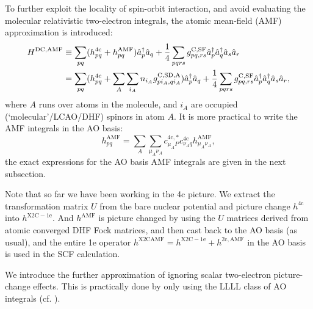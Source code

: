 \documentclass{article}
\begin{document}
To further exploit the locality of spin-orbit interaction, and avoid evaluating the molecular relativistic two-electron integrals, the atomic mean-field (AMF) approximation is introduced:
\begin{align}
H^{\mathrm{DC,AMF}}&\equiv\sum_{pq}(h_{pq}^{\mathrm{4c}}+h_{pq}^{\mathrm{AMF}})\hat{a}_p^{\dagger}\hat{a}_q+\frac{1}{4}\sum_{pqrs}g_{pq,rs}^{\mathrm{C,SF}}\hat{a}_p^{\dagger}\hat{a}_q^{\dagger}\hat{a}_s\hat{a}_r\\
&=\sum_{pq}(h_{pq}^{\mathrm{4c}} +\sum_A\sum_{i_A}n_{i_A}g_{p{i_A},q{i_A}}^{\mathrm{C,SD,A}})\hat{a}_p^{\dagger}\hat{a}_q+\frac{1}{4}\sum_{pqrs}g_{pq,rs}^{\mathrm{C,SF}}\hat{a}_p^{\dagger}\hat{a}_q^{\dagger}\hat{a}_s\hat{a}_r,
\end{align}
where $A$ runs over atoms in the molecule, and $i_A$ are occupied (`molecular'/LCAO/DHF) spinors in atom $A$. It is more practical to write the AMF integrals in the AO basis:
\begin{equation}
    h^{\mathrm{AMF}}_{pq}=\sum_A\sum_{\mu_A\nu_A}c^{\mathrm{4c},*}_{\mu_AP}c^{\mathrm{4c}}_{\nu_Aq}h_{\mu_A\nu_A}^{\mathrm{AMF}},
\end{equation}
the exact expressions for the AO basis AMF integrals are given in the next subsection.

Note that so far we have been working in the 4c picture. We extract the transformation matrix $U$ from the bare nuclear potential and picture change $h^{\mathrm{4c}}$ into $h^{\mathrm{X2C-1e}}$. And $h^{\mathrm{AMF}}$ is picture changed by using the $U$ matrices derived from atomic converged DHF Fock matrices, and then cast back to the AO basis (as usual), and the entire 1e operator $h^{\mathrm{X2CAMF}}=h^{\mathrm{X2C-1e}}+h^{\mathrm{2c,AMF}}$ in the AO basis is used in the SCF calculation.

We introduce the further approximation of ignoring scalar two-electron picture-change effects. This is practically done by only using the LLLL class of AO integrals (cf. \cite[eq. 28]{sikkemaMolecularMeanfieldApproach2009}).
\end{document}
